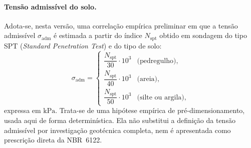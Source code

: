 \paragraph{Tensão admissível do solo.}
Adota-se, nesta versão, uma correlação empírica preliminar em que a tensão admissível $\sigma_{\mathrm{adm}}$ é estimada a partir do índice $N_{\mathrm{spt}}$ obtido em sondagem do tipo SPT (\textit{Standard Penetration Test}) e do tipo de solo:
\begin{equation}
    \sigma_{\mathrm{adm}} = \begin{cases}
        \dfrac{N_{\mathrm{spt}}}{30} \cdot 10^3 & \text{(pedregulho)},\\[4pt]
        \dfrac{N_{\mathrm{spt}}}{40} \cdot 10^3 & \text{(areia)},\\[4pt]
        \dfrac{N_{\mathrm{spt}}}{50} \cdot 10^3 & \text{(silte ou argila)},
    \end{cases}
    \label{eq:sigma_adm}
\end{equation}
expressa em $\si{\kilo\pascal}$. Trata-se de uma hipótese empírica de pré-dimensionamento, usada aqui de forma determinística. Ela não substitui a definição da tensão admissível por investigação geotécnica completa, nem é apresentada como prescrição direta da NBR~6122.

